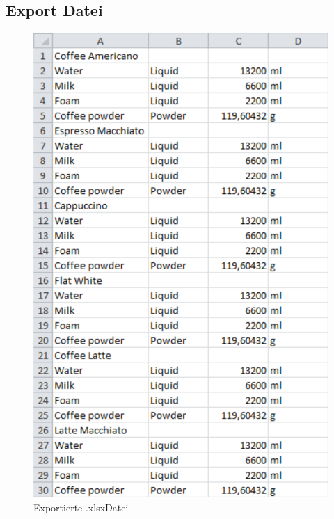 \subsection{Export Datei}
\label{app:ExportDatei}

\begin{figure}[htb]
	\centering
	\includegraphics[scale=0.8]{Bilder/Export.png}
	\caption{Exportierte \glqq .xlsx\grqq \space Datei}
	\label{fig:Export}
\end{figure} 